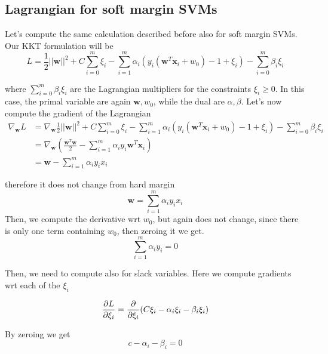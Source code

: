     \subsection{Lagrangian for soft margin SVMs}
    Let's compute the same calculation described before also for soft margin SVMs. 
    Our KKT formulation will be
    $$L = \frac{1}{2} ||\pmb{w}||^2 + C \sum_{i=0}^m \xi_i -
        \sum_{i=1}^m \alpha_i (y_i (\pmb{w}^T \pmb{x}_i + w_0) - 1 + \xi_i)
        -\sum_{i=0}^m \beta_i \xi_i
        $$

    where $\sum_{i=0}^m \beta_i \xi_i$ are the Lagrangian multipliers for the constraints $\xi_i \geq 0$.
    In this case, the primal variable are again $\pmb{w}, w_0$, while the dual are $\alpha, \beta$.
    Let's now compute the gradient of the Lagrangian
    \begin{align*}
        \nabla_{\pmb{w}} L &= \nabla_{\pmb{w}} {\frac{1}{2} ||\pmb{w}||^2 + C \sum_{i=0}^m \xi_i -
        \sum_{i=1}^m \alpha_i (y_i (\pmb{w}^T \pmb{x}_i + w_0) - 1 + \xi_i)
        -\sum_{i=0}^m \beta_i \xi_i}\\
        &= \nabla _{\pmb{w}} \left( \frac{\pmb{w}^T \pmb{w}}{2} - \sum_{i=1}^m \alpha_i y_i \pmb{w}^T \pmb{x}_i \right)\\
        &= \pmb{w} - \sum_{i=1}^m \alpha_i y_i x_i
    \end{align*}
    
    therefore it does not change from hard margin
    \begin{equation}
        \pmb{w} = \sum_{i=1}^m \alpha_i y_i x_i
        \label{eq:soft_margin_w_result}
    \end{equation}
    Then, we compute the derivative wrt $w_0$, but again does not change, since there is only one term containing $w_0$, then zeroing it we get. 
    \begin{equation}
        \sum_{i=1}^m \alpha_i y_i = 0
        \label{eq:soft_margin_w_0_result}
    \end{equation}

    Then, we need to compute also for slack variables. Here we compute gradients wrt each of the $\xi_i$

    $$\pdv{L}{\xi_i} = \pdv{}{\xi_i} (C\xi_i - \alpha_i \xi_i - \beta_i \xi_i)$$

    By zeroing we get
    \begin{equation}
        c - \alpha_i - \beta_i = 0
        \label{eq:soft_margin_xi_gradient}
    \end{equation}    

